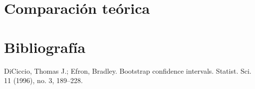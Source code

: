\documentclass[11pt]{article}
\begin{document}
\section*{Comparación teórica}















\section*{Bibliografía}

DiCiccio, Thomas J.; Efron, Bradley. Bootstrap confidence intervals. 
 Statist. Sci. 11 (1996), no. 3, 189--228.
\end{document}
